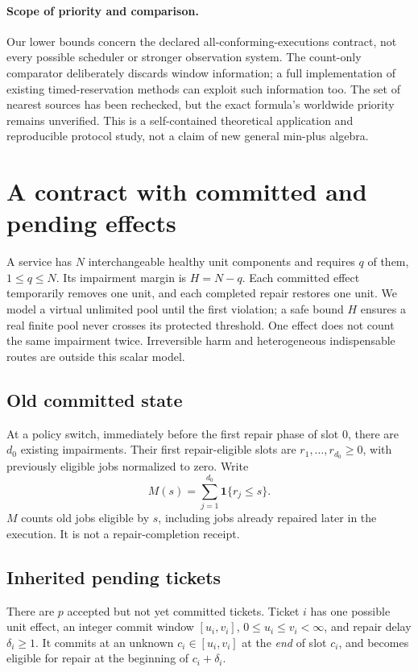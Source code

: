 \documentclass[11pt,a4paper]{article}
\theoremstyle{definition}\newtheorem{definition}{Definition}
\newcommand{\one}{\mathbf 1}
\begin{document}
\paragraph{Scope of priority and comparison.}
Our lower bounds concern the declared all-conforming-executions contract, not every possible scheduler or stronger observation system. The count-only comparator deliberately discards window information; a full implementation of existing timed-reservation methods can exploit such information too. The set of nearest sources has been rechecked, but the exact formula's worldwide priority remains unverified. This is a self-contained theoretical application and reproducible protocol study, not a claim of new general min-plus algebra.

\section{A contract with committed and pending effects}
\label{sec:model}
A service has $N$ interchangeable healthy unit components and requires $q$ of them, $1\le q\le N$. Its impairment margin is $H=N-q$. Each committed effect temporarily removes one unit, and each completed repair restores one unit. We model a virtual unlimited pool until the first violation; a safe bound $H$ ensures a real finite pool never crosses its protected threshold. One effect does not count the same impairment twice. Irreversible harm and heterogeneous indispensable routes are outside this scalar model.

\subsection{Old committed state}
At a policy switch, immediately before the first repair phase of slot 0, there are $d_0$ existing impairments. Their first repair-eligible slots are $r_1,\ldots,r_{d_0}\ge0$, with previously eligible jobs normalized to zero. Write
\begin{equation}
M(s)=\sum_{j=1}^{d_0}\one\{r_j\le s\}.
\end{equation}
$M$ counts old jobs eligible by $s$, including jobs already repaired later in the execution. It is not a repair-completion receipt.

\subsection{Inherited pending tickets}
There are $p$ accepted but not yet committed tickets. Ticket $i$ has one possible unit effect, an integer commit window $[u_i,v_i]$, $0\le u_i\le v_i<\infty$, and repair delay $\delta_i\ge1$. It commits at an unknown $c_i\in[u_i,v_i]$ at the \emph{end} of slot $c_i$, and becomes eligible for repair at the beginning of $c_i+\delta_i$.
\end{document}
